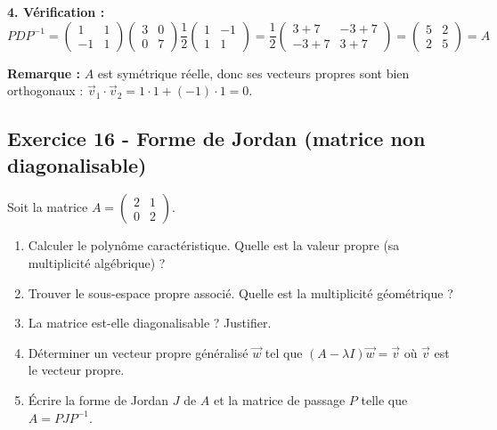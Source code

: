 \documentclass[12pt,a4paper]{article}
\begin{document}
\begin{boitecorrige}
\textbf{4. Vérification :}
\[
PDP^{-1} = \begin{pmatrix}1&1\\-1&1\end{pmatrix}\begin{pmatrix}3&0\\0&7\end{pmatrix}\frac{1}{2}\begin{pmatrix}1&-1\\1&1\end{pmatrix}
= \frac{1}{2}\begin{pmatrix}3+7 & -3+7\\-3+7 & 3+7\end{pmatrix} = \begin{pmatrix}5&2\\2&5\end{pmatrix} = A \;
\]

\textbf{Remarque :} $A$ est symétrique réelle, donc ses vecteurs propres sont bien orthogonaux : $\vec{v}_1\cdot\vec{v}_2 = 1\cdot1+(-1)\cdot1 = 0$.
\end{boitecorrige}

\subsection*{Exercice 16 - Forme de Jordan (matrice non diagonalisable) \niveau{\difficile}}
\begin{boiteexercice}
Soit la matrice $A = \begin{pmatrix}2 & 1 \\ 0 & 2\end{pmatrix}$.

\begin{enumerate}
  \item Calculer le polynôme caractéristique. Quelle est la valeur propre (sa multiplicité algébrique) ?
  \item Trouver le sous-espace propre associé. Quelle est la multiplicité géométrique ?
  \item La matrice est-elle diagonalisable ? Justifier.
  \item Déterminer un vecteur propre généralisé $\vec{w}$ tel que $(A-\lambda I)\vec{w} = \vec{v}$ où $\vec{v}$ est le vecteur propre.
  \item Écrire la forme de Jordan $J$ de $A$ et la matrice de passage $P$ telle que $A = PJP^{-1}$.
\end{enumerate}
\end{boiteexercice}
\end{document}

